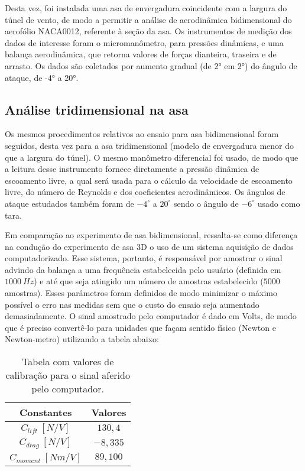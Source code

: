 Desta vez, foi instalada uma asa de envergadura coincidente com a largura do túnel de vento, de modo a permitir a análise de aerodinâmica bidimensional do aerofólio NACA0012, referente à seção da asa. Os instrumentos de medição dos dados de interesse foram o micromanômetro, para pressões dinâmicas, e uma balança aerodinâmica, que retorna valores de forças dianteira, traseira e de arrasto. Os dados são coletados por aumento gradual (de 2° em 2°) do ângulo de ataque, de -4° a 20°. %


\subsection{Análise tridimensional na asa}
Os mesmos procedimentos relativos ao ensaio para asa bidimensional foram seguidos, desta vez para a asa tridimensional (modelo de envergadura menor do que a largura do túnel). O mesmo manômetro diferencial foi usado, de modo que a leitura desse instrumento fornece diretamente a pressão dinâmica de escoamento livre, a qual será usada para o cálculo da velocidade de escoamento livre, do número de Reynolds e dos coeficientes aerodinâmicos. Os ângulos de ataque estudados também foram de $-4^{\circ}$ a $20^{\circ}$ sendo o ângulo de $-6^{\circ}$ usado como tara.

Em comparação ao experimento de asa bidimensional, ressalta-se como diferença na condução do experimento de asa 3D o uso de um sistema aquisição de dados computadorizado. Esse sistema, portanto, é responsável por amostrar o sinal advindo da balança a uma frequência estabelecida pelo usuário (definida em $1000\ Hz$) e até que seja atingido um número de amostras estabelecido ($5000$ amostras). Esses parâmetros foram definidos de modo minimizar o máximo possível o erro nas medidas sem que o custo do ensaio seja aumentado demasiadamente. O sinal amostrado pelo computador é dado em Volts, de modo que é preciso convertê-lo para unidades que façam sentido físico (Newton e Newton-metro) utilizando a tabela abaixo:
\begin{table}[h]
\centering
\caption{Tabela com valores de calibração para o sinal aferido pelo computador.}
\begin{tabular}{@{}cc@{}}
\toprule
Constantes         & Valores  \\ \midrule
$C_{lift}\ [N/V]$    & $130,4$  \\
$C_{drag}\ [N/V]$    & $-8,335$ \\
$C_{moment}\ [Nm/V]$ & $89,100$ \\ \bottomrule
\end{tabular}
\end{table}

